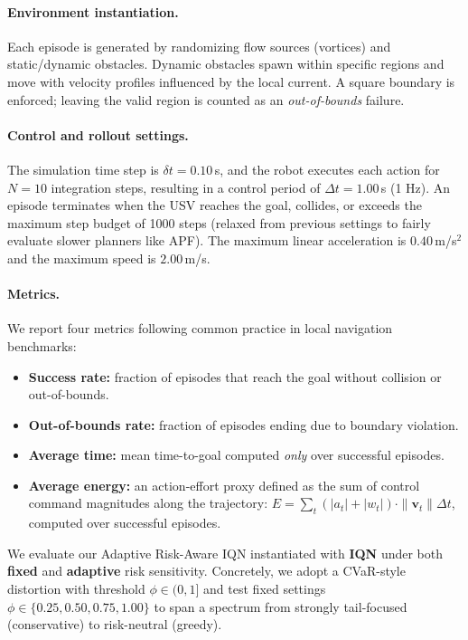 \documentclass[runningheads]{llncs}
\begin{document}
\paragraph{Environment instantiation.}
Each episode is generated by randomizing flow sources (vortices) and static/dynamic obstacles.
Dynamic obstacles spawn within specific regions and move with velocity profiles influenced by the local current.
A square boundary is enforced; leaving the valid region is counted as an \emph{out-of-bounds} failure.

\paragraph{Control and rollout settings.}
The simulation time step is $\delta t = 0.10$\,s, and the robot executes each action for $N=10$ integration steps, resulting in a control period of $\Delta t=1.00$\,s (1 Hz).
An episode terminates when the USV reaches the goal, collides, or exceeds the maximum step budget of 1000 steps (relaxed from previous settings to fairly evaluate slower planners like APF). The maximum linear acceleration is $0.40$\,m/s$^2$ and the maximum speed is $2.00$\,m/s.

\paragraph{Metrics.}
We report four metrics following common practice in local navigation benchmarks:
\begin{itemize}
    \item \textbf{Success rate:} fraction of episodes that reach the goal without collision or out-of-bounds.
    \item \textbf{Out-of-bounds rate:} fraction of episodes ending due to boundary violation.
    \item \textbf{Average time:} mean time-to-goal computed \emph{only} over successful episodes.
    \item \textbf{Average energy:} an action-effort proxy defined as the sum of control command magnitudes along the trajectory: $E = \sum_{t} (|a_t| + |w_t|) \cdot \|\mathbf{v}_t\| \Delta t$, computed over successful episodes.
\end{itemize}

We evaluate our Adaptive Risk-Aware IQN instantiated with \textbf{IQN} under both \textbf{fixed} and \textbf{adaptive} risk sensitivity.
Concretely, we adopt a CVaR-style distortion with threshold $\phi \in (0,1]$ and test fixed settings $\phi \in \{0.25,0.50,0.75,1.00\}$ to span a spectrum from strongly tail-focused (conservative) to risk-neutral (greedy).
\end{document}
